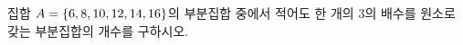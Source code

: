 집합 $A=\{6{,}\mkern3mu\mathopen{}8{,}\mkern3mu\mathopen{}10{,}\mkern3mu\mathopen{}12{,}\mkern3mu\mathopen{}14{,}\mkern3mu\mathopen{}16\}$의 부분집합 중에서 적어도 한 개의 $3$의 배수를 원소로 갖는 부분집합의 개수를 구하시오.
